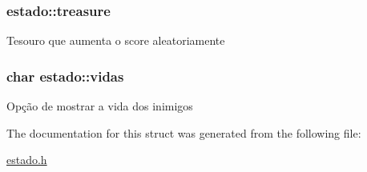 \subsubsection[{\texorpdfstring{treasure}{treasure}}]{ estado\+::treasure}\hypertarget{structestado_ae4cc2103608d31c5a97732cc6411334a}{}\label{structestado_ae4cc2103608d31c5a97732cc6411334a}
Tesouro que aumenta o score aleatoriamente 
\subsubsection[{\texorpdfstring{vidas}{vidas}}]{\setlength{\rightskip}{0pt plus 5cm}char estado\+::vidas}\hypertarget{structestado_a1dcd7329b4a4cd561a7b72b2552f1d6c}{}\label{structestado_a1dcd7329b4a4cd561a7b72b2552f1d6c}
Opção de mostrar a vida dos inimigos 

The documentation for this struct was generated from the following file\+:\begin{DoxyCompactItemize}
\item 
\hyperlink{estado_8h}{estado.\+h}\end{DoxyCompactItemize}
